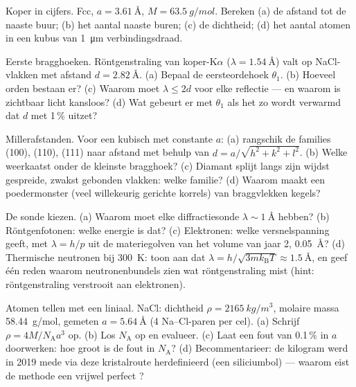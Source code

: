 \begin{exercise}[$\star$]\label{exo:b3:crystalline-solids:2}
Koper in cijfers. Fcc, $a = \qty{3.61}{\angstrom}$, $M =
\qty{63.5}{g/mol}$. Bereken (a) de afstand tot de naaste buur;
(b) het aantal naaste buren; (c) de dichtheid; (d) het
aantal atomen in een kubus van \qty{1}{\micro m} verbindingsdraad.
\end{exercise}

\begin{exercise}[$\star$]\label{exo:b3:crystalline-solids:3}
Eerste bragghoeken. Röntgenstraling van koper-K$\alpha$
($\lambda = \qty{1.54}{\angstrom}$) valt op NaCl-vlakken met afstand
$d = \qty{2.82}{\angstrom}$. (a) Bepaal de eersteordehoek
$\theta_1$. (b) Hoeveel orden bestaan er? (c) Waarom moet
$\lambda \le 2d$ voor elke reflectie --- en waarom is zichtbaar licht
kansloos? (d) Wat gebeurt er met $\theta_1$ als het  zo wordt verwarmd
dat $d$ met 1\,\% uitzet?
\end{exercise}

\begin{exercise}[$\star$]\label{exo:b3:crystalline-solids:4}
Millerafstanden. Voor een kubisch  met constante $a$: (a) rangschik de
families (100), (110), (111) naar afstand met behulp van
$d = a/\sqrt{h^2+k^2+l^2}$. (b) Welke weerkaatst onder de kleinste
bragghoek? (c) Diamant splijt langs zijn wijdst gespreide, zwakst
gebonden vlakken: welke familie? (d) Waarom maakt een poedermonster
(veel willekeurig gerichte korrels) van braggvlekken kegels?
\end{exercise}

\begin{exercise}[$\star\star$]\label{exo:b3:crystalline-solids:5}
De sonde kiezen. (a) Waarom moet elke diffractiesonde
$\lambda \sim \qty{1}{\angstrom}$ hebben? (b) Röntgenfotonen: welke energie
is dat? (c) Elektronen: welke versnelspanning geeft, met $\lambda = h/p$ uit de
materiegolven van het volume van jaar 2,
\qty{0.05}{\angstrom}? (d) Thermische neutronen bij \qty{300}{K}: toon aan dat
$\lambda = h/\sqrt{3mk_{\text{B}}T} \approx \qty{1.5}{\angstrom}$,
en geef één reden waarom neutronenbundels zien wat röntgenstraling mist (hint:
röntgenstraling verstrooit aan elektronen).
\end{exercise}

\begin{exercise}[$\star\star$]\label{exo:b3:crystalline-solids:6}
Atomen tellen met een liniaal. NaCl: dichtheid
$\rho = \qty{2165}{kg/m^3}$, molaire massa \qty{58.44}{g/mol},
gemeten  $a = \qty{5.64}{\angstrom}$ (4 Na--Cl-paren
per cel). (a) Schrijf $\rho = 4M/N_{\text{A}}a^3$ op. (b) Los
$N_{\text{A}}$ op en evalueer. (c) Laat een fout van 0.1\,\% in
$a$ doorwerken: hoe groot is de fout in $N_{\text{A}}$? (d) Becommentarieer: de kilogram
werd in 2019 mede via deze kristalroute herdefinieerd (een siliciumbol)
--- waarom eist de methode een vrijwel perfect ?
\end{exercise}

